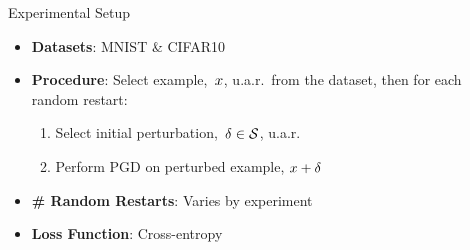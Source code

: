 \begin{frame}{Experimental Setup}
  \begin{itemize}[<+->]
    \setlength{\itemsep}{10pt}
    \item \textbf{Datasets}: MNIST \& CIFAR10

    \item \textbf{Procedure}: Select example,~$x$, u.a.r.\ from the dataset, then for each random restart:
      \begin{enumerate}[<+->]
        \setlength\itemsep{6pt}
        \item Select initial perturbation,~${\delta \in \mathcal{S}}$, u.a.r.
        \item Perform PGD on perturbed example, ${x + \delta}$
      \end{enumerate}

    \item \textbf{\# Random Restarts}: Varies by experiment

    \item \textbf{Loss Function}: Cross-entropy
  \end{itemize}
\end{frame}


